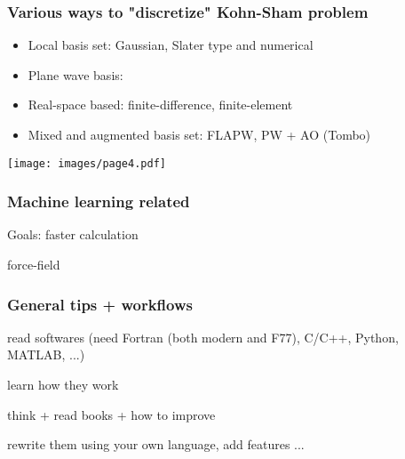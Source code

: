 \documentclass[english,9pt]{beamer}
\begin{document}
\begin{frame}
\frametitle{Various ways to "discretize" Kohn-Sham problem}

\begin{itemize}
\item Local basis set: Gaussian, Slater type and numerical
\item Plane wave basis:
\item Real-space based: finite-difference, finite-element
\item Mixed and augmented basis set: FLAPW, PW + AO (Tombo)
\end{itemize}


\end{frame}


\begin{frame}[plain]

\texttt{[image: images/page4.pdf]}

\end{frame}


\begin{frame}
\frametitle{Machine learning related}

Goals: faster calculation

force-field

\end{frame}


\begin{frame}
\frametitle{General tips + workflows}

read softwares (need Fortran (both modern and F77), C/C++, Python, MATLAB, ...)

learn how they work

think + read books + how to improve

rewrite them using your own language, add features ...

\end{frame}
\end{document}
